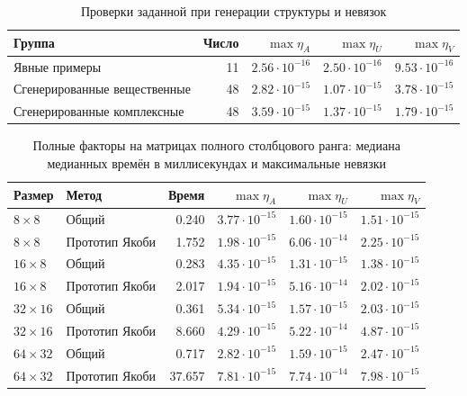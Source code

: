 \begin{table}[htbp]
\centering\small
\caption{Проверки заданной при генерации структуры и невязок}
\label{tab:structural}
\begin{tabular}{@{}lrrrr@{}}
\toprule
Группа & Число & $\max\eta_A$ & $\max\eta_U$ & $\max\eta_V$\\
\midrule
Явные примеры & 11 & $2.56\cdot10^{-16}$ & $2.50\cdot10^{-16}$ & $9.53\cdot10^{-16}$\\
Сгенерированные вещественные & 48 & $2.82\cdot10^{-15}$ & $1.07\cdot10^{-15}$ & $3.78\cdot10^{-15}$\\
Сгенерированные комплексные & 48 & $3.59\cdot10^{-15}$ & $1.37\cdot10^{-15}$ & $1.79\cdot10^{-15}$\\
\bottomrule
\end{tabular}
\end{table}

\begin{table}[htbp]
\centering\small
\caption{Полные факторы на матрицах полного столбцового ранга: медиана медианных времён в миллисекундах и максимальные невязки}
\label{tab:comparison}
\begin{tabular}{@{}llrrrr@{}}
\toprule
Размер & Метод & Время & $\max\eta_A$ & $\max\eta_U$ & $\max\eta_V$\\
\midrule
$8\times 8$ & Общий & 0.240 & $3.77\cdot10^{-15}$ & $1.60\cdot10^{-15}$ & $1.51\cdot10^{-15}$\\
$8\times 8$ & Прототип Якоби & 1.752 & $1.98\cdot10^{-15}$ & $6.06\cdot10^{-14}$ & $2.25\cdot10^{-15}$\\
$16\times 8$ & Общий & 0.283 & $4.35\cdot10^{-15}$ & $1.31\cdot10^{-15}$ & $1.38\cdot10^{-15}$\\
$16\times 8$ & Прототип Якоби & 2.017 & $1.94\cdot10^{-15}$ & $5.16\cdot10^{-14}$ & $2.02\cdot10^{-15}$\\
$32\times 16$ & Общий & 0.361 & $5.34\cdot10^{-15}$ & $1.57\cdot10^{-15}$ & $2.03\cdot10^{-15}$\\
$32\times 16$ & Прототип Якоби & 8.660 & $4.29\cdot10^{-15}$ & $5.22\cdot10^{-14}$ & $4.87\cdot10^{-15}$\\
$64\times 32$ & Общий & 0.717 & $2.82\cdot10^{-15}$ & $1.59\cdot10^{-15}$ & $2.47\cdot10^{-15}$\\
$64\times 32$ & Прототип Якоби & 37.657 & $7.81\cdot10^{-15}$ & $7.74\cdot10^{-14}$ & $7.98\cdot10^{-15}$\\
\bottomrule
\end{tabular}
\end{table}

